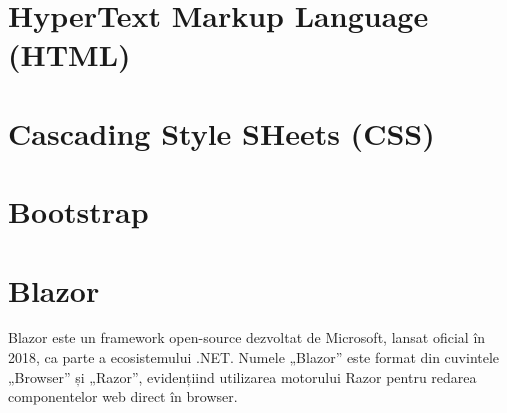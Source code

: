 \section{HyperText Markup Language (HTML)}
\section{Cascading Style SHeets (CSS)}
\section{Bootstrap}
\section{Blazor}
Blazor este un framework open-source dezvoltat de Microsoft, lansat oficial în 2018, ca parte a ecosistemului .NET. Numele „Blazor” este format din cuvintele „Browser” și „Razor”, evidențiind utilizarea motorului Razor pentru redarea componentelor web direct în browser. \parencite{blazor}

